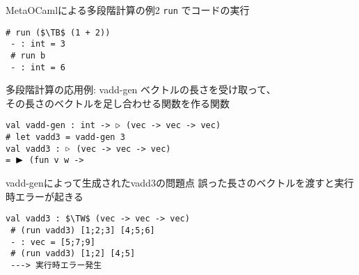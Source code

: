 \documentclass[dvipdfmx,aspectratio=169, 20pt]{beamer}
\begin{document}
\begin{frame}[fragile]{MetaOCamlによる多段階計算の例2}
    \verb|run| でコードの実行
    \begin{exampleblock}{}
        \begin{Verbatim}[commandchars=\\\{\},codes={\catcode`$=3\catcode`^=7}]
 # run ($\TB$ (1 + 2))
 - : int = 3
 # run b
 - : int = 6
        \end{Verbatim}
    \end{exampleblock}
\end{frame}

\begin{frame}[fragile]{多段階計算の応用例: vadd-gen}
    ベクトルの長さを受け取って、\\その長さのベクトルを足し合わせる関数を作る関数
    \begin{exampleblock}{}
        \hspace{5mm} {\tt val vadd-gen : int -> ${\mathop{\triangleright}}$ (vec -> vec -> vec)} \\
        \hspace{5mm} {\tt \# let vadd3 = vadd-gen 3} \\
        \hspace{5mm} {\tt val vadd3 : ${\mathop{\triangleright}}$ (vec -> vec -> vec)} \\
        \hspace{20mm} {\tt = ${\mathop{\blacktriangleright}}$ (fun v w -> } \\
        \hspace{25mm} 
    \end{exampleblock}
\end{frame}

\begin{frame}[fragile]{vadd-genによって生成されたvadd3の問題点}
    誤った長さのベクトルを渡すと実行時エラーが起きる
    \begin{exampleblock}{}
        \begin{Verbatim}[commandchars=\\\{\},codes={\catcode`$=3\catcode`^=7}]
 val vadd3 : $\TW$ (vec -> vec -> vec)
 # (run vadd3) [1;2;3] [4;5;6]
 - : vec = [5;7;9]
 # (run vadd3) [1;2] [4;5]
 ---> 実行時エラー発生
    \end{Verbatim}
    \end{exampleblock}
\end{frame}
\end{document}
